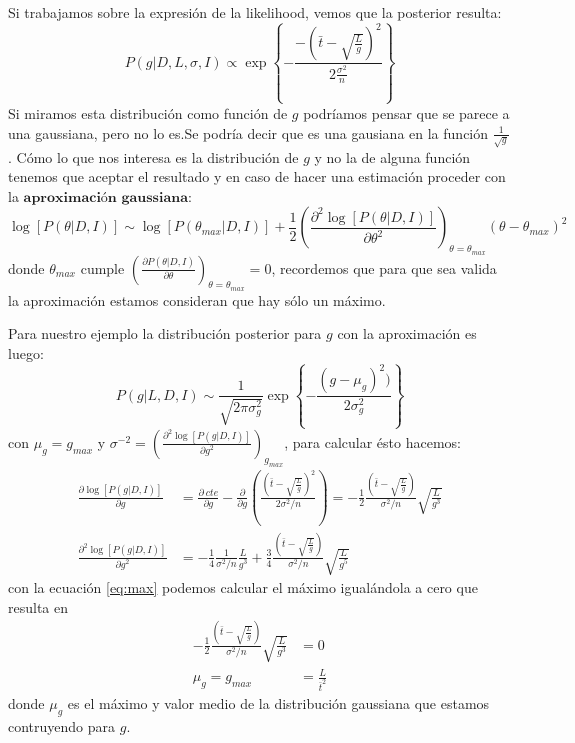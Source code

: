 \documentclass[aps,onecolumn,12pt,notitlepage]{revtex4-1}
\begin{document}
Si trabajamos sobre la expresión de la likelihood, vemos que la posterior resulta:
\begin{equation}
\displaystyle{P(g|D,L,\sigma,I) \propto \exp \left\{ -\frac{-\left(\bar{t} - \sqrt{\frac{L}{g}}\right)^2}{2\frac{\sigma^2}{n}} \right\}}
\end{equation}
Si miramos esta distribución como función de $g$ podríamos pensar que se parece a una gaussiana, pero no lo es.Se podría decir que es una gausiana en la función $\frac{1}{\sqrt{g}}$. Cómo lo que nos interesa es la distribución de $g$ y no la de alguna función tenemos que aceptar el resultado y en caso de hacer una estimación proceder con la $\textbf{aproximación gaussiana}$:
\begin{equation}
 \displaystyle \log\left[P(\theta|D,I)\right] \sim \log\left[P(\theta_{max}|D,I)\right] + \frac{1}{2} \left(\frac{\partial^2 \log\left[P(\theta|D,I)\right] }{\partial \theta^2}\right)_{\theta =  \theta_{max}}\left(\theta-\theta_{max}\right)^2
\end{equation}
donde $\theta_{max}$ cumple $\left(\frac{\partial P(\theta|D,I)}{\partial \theta} \right)_{\theta= \theta_{max}} = 0$, recordemos que para que sea valida la aproximación estamos consideran que hay sólo un máximo.

Para nuestro ejemplo la distribución posterior para $g$ con la aproximación es luego:
\begin{equation}
P(g|L,D,I) \sim \frac{1}{\sqrt{2\pi\sigma^2_{g}}} \exp \left\{-\frac{(g-\mu_{g})^2)}{2\sigma_{g}^2}\right\}
\end{equation}
con $\mu_{g} = g_{max}$ y $ \sigma^{-2} = \left( \frac{\partial^2 \log \left[ P(g|D,I) \right] }{\partial g^2} \right)_{g_{max}}$, para calcular ésto hacemos:
\begin{align}
\frac{\partial \log \left[ P(g|D,I) \right]}{\partial g} &= \frac{\partial \ cte}{\partial g} - \frac{\partial}{\partial g}\left(\frac{\left(\bar{t}-\sqrt{\frac{L}{g}}\right)^2}{2\sigma^{2}/n}\right) = -\frac{1}{2}\frac{(\bar{t}-\sqrt{\frac{L}{g}})}{\sigma^2/n}\sqrt{\frac{L}{g^{3}}} 
\label{eq:max} \\
\frac{\partial^2 \log\left[P(g|D,I)\right] }{\partial g^2} &= -\frac{1}{4}\frac{1}{\sigma^2/n}\frac{L}{g^{3}} + \frac{3}{4} \frac{\left(\bar{t}-\sqrt{\frac{L}{g}}\right)}{\sigma^2/n}\sqrt{\frac{L}{g^{5}}}
\label{eq:curv}
\end{align}
con la ecuación \ref{eq:max} podemos calcular el máximo igualándola a cero que resulta en
\begin{equation}
\begin{aligned}
-\frac{1}{2} \frac{(\bar{t}-\sqrt{\frac{L}{g}})}{\sigma^2/n}\sqrt{\frac{L}{g^{3}}} &= 0 \\
\mu_{g} = g_{max} &= \frac{L}{\bar{t}^2}
\end{aligned}
\end{equation}
donde $\mu_{g}$ es el máximo y valor medio de la distribución gaussiana que estamos contruyendo para $g$.
\end{document}
